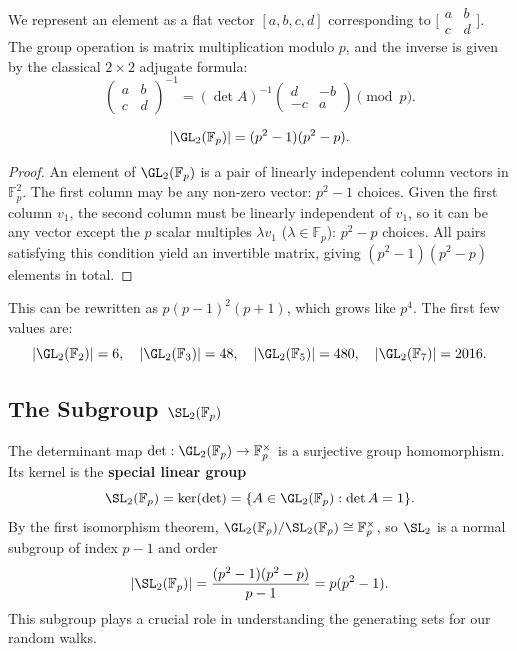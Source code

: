 We represent an element as a flat vector $[a, b, c, d]$ corresponding to
$\bigl[\begin{smallmatrix}a & b \\ c & d\end{smallmatrix}\bigr]$.
The group operation is matrix multiplication modulo $p$, and the inverse is
given by the classical $2 \times 2$ adjugate formula:
\[
  \begin{pmatrix} a & b \\ c & d \end{pmatrix}^{-1}
  = (\det A)^{-1} \begin{pmatrix} d & -b \\ -c & a \end{pmatrix} \pmod{p}.
\]

\begin{lemma}
\[
  |\GL_2(\mathbb{F}_p)| = (p^2 - 1)(p^2 - p).
\]
\end{lemma}

\begin{proof}
An element of $\GL_2(\mathbb{F}_p)$ is a pair of linearly independent column
vectors in $\mathbb{F}_p^2$.
The first column may be any non-zero vector: $p^2 - 1$ choices.
Given the first column $v_1$, the second column must be linearly independent of
$v_1$, so it can be any vector except the $p$ scalar multiples $\lambda v_1$
($\lambda \in \mathbb{F}_p$): $p^2 - p$ choices.
All pairs satisfying this condition yield an invertible matrix, giving
$(p^2 - 1)(p^2 - p)$ elements in total.
\end{proof}

This can be rewritten as $p(p-1)^2(p+1)$, which grows like $p^4$.
The first few values are:
\[
  |\GL_2(\mathbb{F}_2)| = 6, \quad
  |\GL_2(\mathbb{F}_3)| = 48, \quad
  |\GL_2(\mathbb{F}_5)| = 480, \quad
  |\GL_2(\mathbb{F}_7)| = 2016.
\]

\subsection{The Subgroup \texorpdfstring{$\SL_2(\mathbb{F}_p)$}{SL2(Fp)}}

The determinant map $\det : \GL_2(\mathbb{F}_p) \to \mathbb{F}_p^\times$ is a
surjective group homomorphism.
Its kernel is the \textbf{special linear group}
\[
  \SL_2(\mathbb{F}_p) = \ker(\det) = \{A \in \GL_2(\mathbb{F}_p) : \det A = 1\}.
\]
By the first isomorphism theorem,
$\GL_2(\mathbb{F}_p) / \SL_2(\mathbb{F}_p) \cong \mathbb{F}_p^\times$,
so $\SL_2$ is a normal subgroup of index $p - 1$ and order
\[
  |\SL_2(\mathbb{F}_p)| = \frac{(p^2-1)(p^2-p)}{p-1} = p(p^2-1).
\]
This subgroup plays a crucial role in understanding the generating sets for our
random walks.

